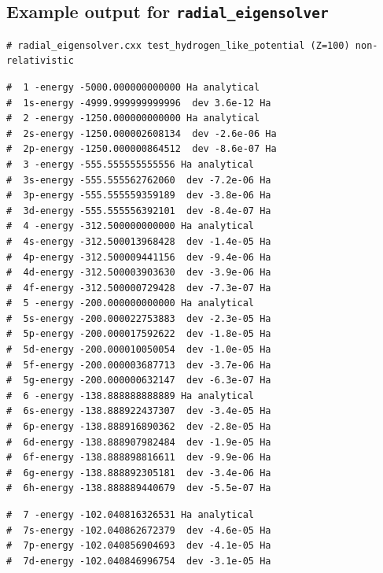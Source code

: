 \documentclass[oribibl]{llncs}
\newcommand{\ttt}[1]{\texttt{#1}}
\begin{document}
\newpage
\begin{landscape}
\subsection{Example output for \ttt{radial\_eigensolver}} \label{sec:example-output-for-radial-_eigensolver}
\small
\begin{verbatim}
# radial_eigensolver.cxx test_hydrogen_like_potential (Z=100) non-relativistic
\end{verbatim}
%
\noindent
\begin{minipage}[t]{.7\textwidth}
\raggedright
%
\begin{verbatim}
#  1 -energy -5000.000000000000 Ha analytical
#  1s-energy -4999.999999999996  dev 3.6e-12 Ha
#  2 -energy -1250.000000000000 Ha analytical
#  2s-energy -1250.000002608134  dev -2.6e-06 Ha
#  2p-energy -1250.000000864512  dev -8.6e-07 Ha
#  3 -energy -555.555555555556 Ha analytical
#  3s-energy -555.555562762060  dev -7.2e-06 Ha
#  3p-energy -555.555559359189  dev -3.8e-06 Ha
#  3d-energy -555.555556392101  dev -8.4e-07 Ha
#  4 -energy -312.500000000000 Ha analytical
#  4s-energy -312.500013968428  dev -1.4e-05 Ha
#  4p-energy -312.500009441156  dev -9.4e-06 Ha
#  4d-energy -312.500003903630  dev -3.9e-06 Ha
#  4f-energy -312.500000729428  dev -7.3e-07 Ha
#  5 -energy -200.000000000000 Ha analytical
#  5s-energy -200.000022753883  dev -2.3e-05 Ha
#  5p-energy -200.000017592622  dev -1.8e-05 Ha
#  5d-energy -200.000010050054  dev -1.0e-05 Ha
#  5f-energy -200.000003687713  dev -3.7e-06 Ha
#  5g-energy -200.000000632147  dev -6.3e-07 Ha
#  6 -energy -138.888888888889 Ha analytical
#  6s-energy -138.888922437307  dev -3.4e-05 Ha
#  6p-energy -138.888916890362  dev -2.8e-05 Ha
#  6d-energy -138.888907982484  dev -1.9e-05 Ha
#  6f-energy -138.888898816611  dev -9.9e-06 Ha
#  6g-energy -138.888892305181  dev -3.4e-06 Ha
#  6h-energy -138.888889440679  dev -5.5e-07 Ha
\end{verbatim}
%
\end{minipage}%
\begin{minipage}[t]{.7\textwidth}
\raggedleft
%
\begin{verbatim}
#  7 -energy -102.040816326531 Ha analytical
#  7s-energy -102.040862672379  dev -4.6e-05 Ha
#  7p-energy -102.040856904693  dev -4.1e-05 Ha
#  7d-energy -102.040846996754  dev -3.1e-05 Ha

\end{verbatim}
\end{minipage}
\end{landscape}
\end{document}
